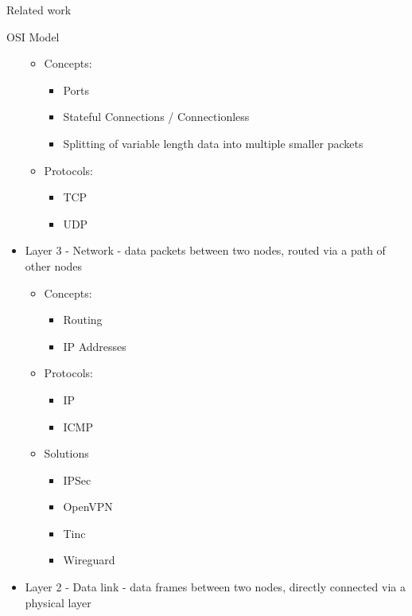 \begin{frame}[fragile]{Related work}
\begin{block}{OSI Model}
\begin{itemize}
  \begin{itemize}
  \tightlist
  \item
    Concepts:

    \begin{itemize}
    \tightlist
    \item
      Ports
    \item
      Stateful Connections / Connectionless
    \item
      Splitting of variable length data into multiple smaller packets
    \end{itemize}
  \item
    Protocols:

    \begin{itemize}
    \tightlist
    \item
      TCP
    \item
      UDP
    \end{itemize}
  \end{itemize}
\item
  Layer 3 - Network - data packets between two nodes, routed via a path
  of other nodes

  \begin{itemize}
  \tightlist
  \item
    Concepts:

    \begin{itemize}
    \tightlist
    \item
      Routing
    \item
      IP Addresses
    \end{itemize}
  \item
    Protocols:

    \begin{itemize}
    \tightlist
    \item
      IP
    \item
      ICMP
    \end{itemize}
  \item
    Solutions

    \begin{itemize}
    \tightlist
    \item
      IPSec
    \item
      OpenVPN
    \item
      Tinc
    \item
      Wireguard
    \end{itemize}
  \end{itemize}
\item
  Layer 2 - Data link - data frames between two nodes, directly
  connected via a physical layer


\end{itemize}
\end{block}
\end{frame}
